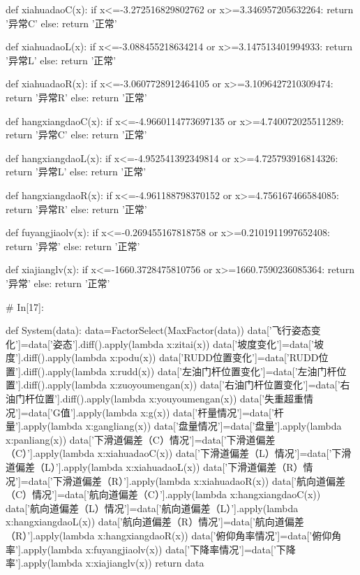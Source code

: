 \documentclass{MathorCupModeling}
\begin{document}
\begin{python}
def xiahuadaoC(x):
    if x<=-3.272516829802762 or x>=3.346957205632264:
        return '异常C'
    else:
        return '正常'


def xiahuadaoL(x):
    if x<=-3.088455218634214 or x>=3.147513401994933:
        return '异常L'
    else:
        return '正常'


def xiahuadaoR(x):
    if x<=-3.0607728912464105 or x>=3.1096427210309474:
        return '异常R'
    else:
        return '正常'


def hangxiangdaoC(x):
    if x<=-4.9660114773697135 or x>=4.740072025511289:
        return '异常C'
    else:
        return '正常'


def hangxiangdaoL(x):
    if x<=-4.952541392349814 or x>=4.725793916814326:
        return '异常L'
    else:
        return '正常'


def hangxiangdaoR(x):
    if x<=-4.961188798370152 or x>=4.756167466584085:
        return '异常R'
    else:
        return '正常'


def fuyangjiaolv(x):
    if x<=-0.269455167818758 or x>=0.2101911997652408:
        return '异常'
    else:
        return '正常'


def xiajianglv(x):
    if x<=-1660.3728475810756 or x>=1660.7590236085364:
        return '异常'
    else:
        return '正常'


# In[17]:


def System(data):
    data=FactorSelect(MaxFactor(data))
    data['飞行姿态变化']=data['姿态'].diff().apply(lambda x:zitai(x))
    data['坡度变化']=data['坡度'].diff().apply(lambda x:podu(x))
    data['RUDD位置变化']=data['RUDD位置'].diff().apply(lambda x:rudd(x))
    data['左油门杆位置变化']=data['左油门杆位置'].diff().apply(lambda x:zuoyoumengan(x))
    data['右油门杆位置变化']=data['右油门杆位置'].diff().apply(lambda x:youyoumengan(x))
    data['失重超重情况']=data['G值'].apply(lambda x:g(x))
    data['杆量情况']=data['杆量'].apply(lambda x:gangliang(x))
    data['盘量情况']=data['盘量'].apply(lambda x:panliang(x))
    data['下滑道偏差（C）情况']=data['下滑道偏差（C）'].apply(lambda x:xiahuadaoC(x))
    data['下滑道偏差（L）情况']=data['下滑道偏差（L）'].apply(lambda x:xiahuadaoL(x))
    data['下滑道偏差（R）情况']=data['下滑道偏差（R）'].apply(lambda x:xiahuadaoR(x))
    data['航向道偏差（C）情况']=data['航向道偏差（C）'].apply(lambda x:hangxiangdaoC(x))
    data['航向道偏差（L）情况']=data['航向道偏差（L）'].apply(lambda x:hangxiangdaoL(x))
    data['航向道偏差（R）情况']=data['航向道偏差（R）'].apply(lambda x:hangxiangdaoR(x))
    data['俯仰角率情况']=data['俯仰角率'].apply(lambda x:fuyangjiaolv(x))
    data['下降率情况']=data['下降率'].apply(lambda x:xiajianglv(x))
    return data



\end{python}
\end{document}
